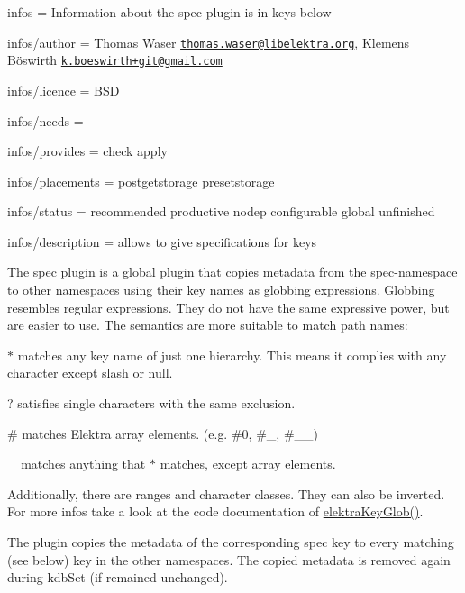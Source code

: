 
\begin{DoxyItemize}
\item infos = Information about the spec plugin is in keys below
\item infos/author = Thomas Waser \href{mailto:thomas.waser@libelektra.org}{\tt thomas.\+waser@libelektra.\+org}, Klemens Böswirth \href{mailto:k.boeswirth+git@gmail.com}{\tt k.\+boeswirth+git@gmail.\+com}
\item infos/licence = B\+SD
\item infos/needs =
\item infos/provides = check apply
\item infos/placements = postgetstorage presetstorage
\item infos/status = recommended productive nodep configurable global unfinished
\item infos/description = allows to give specifications for keys
\end{DoxyItemize}

The spec plugin is a global plugin that copies metadata from the {\ttfamily spec}-\/namespace to other namespaces using their key names as globbing expressions. Globbing resembles regular expressions. They do not have the same expressive power, but are easier to use. The semantics are more suitable to match path names\+:


\begin{DoxyItemize}
\item {\ttfamily $\ast$} matches any key name of just one hierarchy. This means it complies with any character except slash or null.
\item {\ttfamily ?} satisfies single characters with the same exclusion.
\item {\ttfamily \#} matches Elektra array elements. (e.\+g. {\ttfamily \#0}, {\ttfamily \#\+\_}, {\ttfamily \#\+\_\+\+\_})
\item {\ttfamily \+\_\+} matches anything that {\ttfamily $\ast$} matches, except array elements.
\item Additionally, there are ranges and character classes. They can also be inverted. For more infos take a look at the code documentation of {\ttfamily \hyperlink{globbing_8c_ad7700821df72fc0fc3bfc336e4368d29}{elektra\+Key\+Glob()}}.
\end{DoxyItemize}

The plugin copies the metadata of the corresponding {\ttfamily spec} key to every matching (see below) key in the other namespaces. The copied metadata is removed again during {\ttfamily kdb\+Set} (if remained unchanged).

